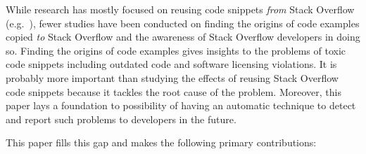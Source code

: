 \documentclass[10pt,journal,compsoc]{IEEEtran}
\begin{document}

While research has mostly focused on reusing code snippets \emph{from} Stack
Overflow (e.g.~\cite{Keivanloo2014,An2017,Yang2016}), fewer studies have been
conducted on finding the origins of code examples copied \emph{to} Stack
Overflow and the awareness of Stack Overflow developers in doing so. Finding the
origins of code examples gives insights to the problems of toxic code snippets
including outdated code and software licensing violations. It is probably more
important than studying the effects of reusing Stack Overflow code snippets
because it tackles the root cause of the problem. Moreover, this paper lays a
foundation to possibility of having an automatic technique to detect and report
such problems to developers in the future.

This paper fills this gap and makes the following primary contributions:
\end{document}

